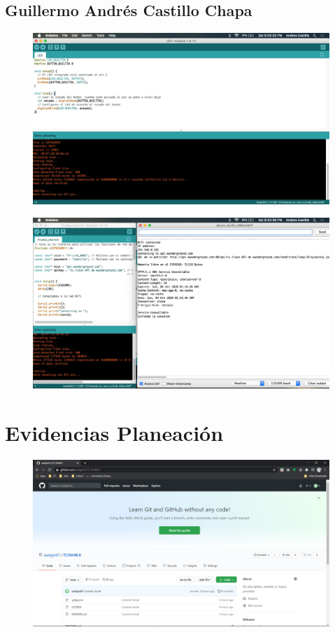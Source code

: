\documentclass[12pt]{article}
\begin{document}
\newpage

\subsection{Guillermo Andrés Castillo Chapa}
\begin{figure}[!h]
\centering
\includegraphics[width = \textwidth]{andres1}
\end{figure}

\begin{figure}[!h]
\centering
\includegraphics[width = \textwidth]{andres2}
\end{figure}

\newpage

\section{Evidencias Planeación}\label{evidencia_Planeacion}
\begin{figure}[!h]
\centering
\includegraphics[width = \textwidth]{repo_Inicio}
\end{figure}
\end{document}
